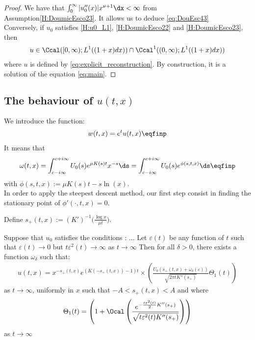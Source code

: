 \begin{proof}
    We have that $\int_0^\infty |u_0''(x)| x^{\nu + 1} \dx < \infty$ from Assumption\eqref{H:DoumicEsco23}. It allows us to deduce \eqref{eq:DouEsc43} \\
    
    Conversely, if $u_0$ satisfies \eqref{H:u0_L1}, \eqref{H:DoumicEsco22} and \eqref{H:DoumicEsco23}, then 
     $$u \in \Ccal([0, \infty); L^1((1+x)dx)) \cap \Ccal^1((0, \infty); L^1((1+x)dx))$$
    where $u$ is defined by \eqref{eq:explicit_reconstruction}. By construction, it is a solution of the equation \eqref{eq:main}.
    \end{proof}

\subsection{The behaviour of $u(t,x)$}
We introduce the function: 
    \begin{align*}
        w(t,x) = e^t u(t,x)
        \eqfinp
    \end{align*}
It means that
    \begin{equation*}
        \omega(t,x)
        = \int_{c-i\infty}^{c+i\infty} U_0(s) e^{\mu K(s)t}x^{-s} \ds
        =  \int_{c-i\infty}^{c+i\infty} U_0(s) e^{\phi(s, t, x)} \ds
        \eqfinp
    \end{equation*}
with $\phi(s,t,x) := \mu K(s) t - s \ln(x) $.\\

In order to apply the steepest descent method, our first step consist in finding the stationary point of $\phi'(\cdot, t, x) = 0$. 

Define $ s_+(t,x) := (K')^{-1} \Big( \frac{\log x}{\mu t} \Big)$.


\begin{theorem}
    Suppose that  $u_0$ satisfies the conditions : ...
    Let $\varepsilon(t)$ be any function of $t$ such that $\varepsilon(t) \to 0$ but $t\varepsilon^2(t) \to \infty$ as $t \to \infty$
Then for all $\delta > 0$, there exists a function $\omega_\delta$ such that:
\begin{equation*}
    \begin{split}
    u(t,x) = x^{-s_+(t,x)}e^{(K(-s_+(t,x))-1)t} \times 
    \left( \frac{U_0(s_+(t,x)+\omega_\delta(\varepsilon))}{\sqrt{2\pi tK''(s_+)}} \Theta_1(t)\right)
    \end{split}
\end{equation*}
as $t\to \infty$, uniformly in $x$ such that $-A < s_+(t,x)< A$ and where 
\begin{align*}
    \Theta_1(t) = \left(1 + \Ocal \left( \frac{e^{-\frac{t\varepsilon^2(t)}{2}K''(s_+)}}{\sqrt{t\varepsilon^2(t)K''(s_+)}} \right) \right)
\end{align*}
as $t \to \infty$
\end{theorem}

